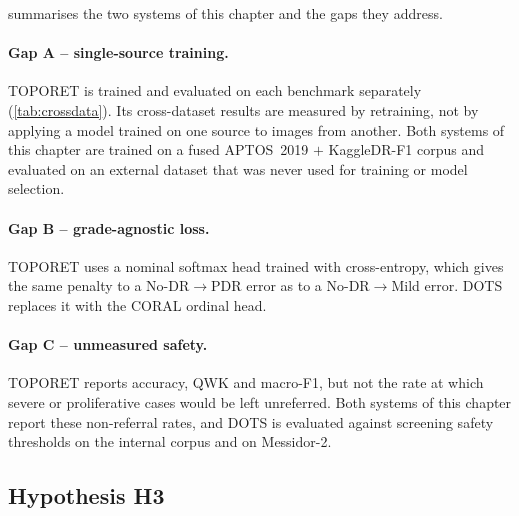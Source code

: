  summarises the two systems of this chapter and the gaps they address.



\paragraph{Gap A -- single-source training.}
TOPORET is trained and evaluated on each benchmark separately (\cref{tab:crossdata}). Its
cross-dataset results are measured by retraining, not by applying a model trained on one
source to images from another. Both systems of this chapter are trained on a fused
APTOS~2019 $+$ KaggleDR-F1 corpus and evaluated on an external dataset that was never used
for training or model selection.

\paragraph{Gap B -- grade-agnostic loss.}
TOPORET uses a nominal softmax head trained with cross-entropy, which gives the same
penalty to a No-DR$\to$PDR error as to a No-DR$\to$Mild error. DOTS replaces it with the
CORAL ordinal head.

\paragraph{Gap C -- unmeasured safety.}
TOPORET reports accuracy, QWK and macro-F1, but not the rate at which severe or
proliferative cases would be left unreferred. Both systems of this chapter report these
non-referral rates, and DOTS is evaluated against screening safety thresholds on the
internal corpus and on Messidor-2.

\subsection{Hypothesis H3}
\label{sec:h3def}

